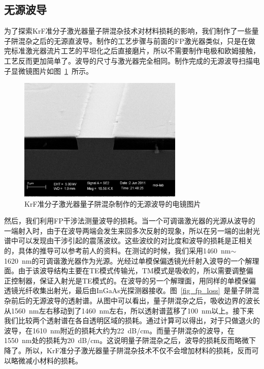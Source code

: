 \documentclass{ZJUthesis}
\begin{document}
\subsection{无源波导}

为了探索KrF准分子激光器量子阱混杂技术对材料损耗的影响，我们制作了一些量子阱混杂之后的无源直波导。制作的工艺步骤与前面的FP激光器类似，只是在做完标准激光器流片工艺的平坦化之后直接磨片，所以不需要制作电极和欧姆接触，工艺反而更加简单了。波导的尺寸与激光器完全相同。制作完成的无源波导扫描电子显微镜图片如图~\ref{fig_wg}~所示。

\begin{figure}[htbp]
    \centering
    \includegraphics[width=0.7\textwidth]{./Pictures/wg.eps}
    \caption{KrF准分子激光器量子阱混杂制作的无源波导的电镜图片}
    \label{fig_wg}
\end{figure}

然后，我们利用FP干涉法测量波导的损耗。当一个可调谐激光器的光源从波导的一端射入时，由于在波导两端会发生来回多次反射的现象，所以在另一端的出射光谱中可以发现由干涉引起的震荡波纹\cite{Feuchter1994High}。这些波纹的对比度和波导的损耗是正相关的，具体的推导可以参考前人的资料\cite{戴道锌2005阵列波导光栅的理论建模与优化设计及其实验研究}。在测试的时候，我们采用1460~nm$\sim$1620~nm的可调谐激光器作为光源。光经过单模保偏透镜光纤射入波导的一个解理面。由于该波导结构主要在TE模式传输光，TM模式是吸收的，所以需要调整偏正控制器，保证入射光是TE模式的。在波导的另一个解理面，用同样的单模保偏透镜光纤收集出射光，最后由InGaAs光探测器接收。图~\ref{fig_fp_loss}~是量子阱混杂前后的无源波导的透射谱。从图中可以看出，量子阱混杂之后，吸收边界的波长从1560~nm左右移动到了1460~nm左右，所以透射谱蓝移了100~nm以上。接下来我们比较两个透射谱在各自透明区域的损耗。通过计算可以得出，对于只做退火的波导，在1610~nm附近的损耗大约为22~dB/cm。而量子阱混杂的波导，在1550~nm处的损耗为20~dB/cm。这说明量子阱混杂之后，波导的损耗反而略微下降了。所以，KrF准分子激光器量子阱混杂技术不仅不会增加材料的损耗，反而可以略微减小材料的损耗。
\end{document}
